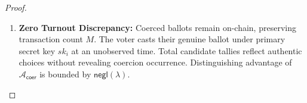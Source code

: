 \documentclass[10pt,letterpaper,journal]{IEEEtran}
\begin{document}
\begin{proof}
\begin{enumerate}[leftmargin=*,noitemsep]
\begin{equation}
  \end{equation}
  (iii)~Trustees accumulate masked ballots into master aggregate ciphertext:
  \begin{equation}
    \mathbf{C}_{\mathsf{agg}} = \sum_{j=1}^M [b_j] \cdot \mathbf{c}_j + E(\mathbf{0}; \mathbf{r}'_j);
  \end{equation}
  (iv)~Trustees jointly decrypt only $\mathbf{C}_{\mathsf{agg}}$. Duress ballots ($b_j = 0$) scale to $E(\mathbf{0})$ and are neutralized. Individual $[b_j]$ and $[\nu_i^{\mathsf{dur}}]$ are never revealed, guaranteeing zero leakage to trustees.
  \item \textbf{Zero Turnout Discrepancy:} Coerced ballots remain on-chain, preserving transaction count $M$. The voter casts their genuine ballot under primary secret key $sk_i$ at an unobserved time. Total candidate tallies reflect authentic choices without revealing coercion occurrence. Distinguishing advantage of $\mathcal{A}_{\mathsf{coer}}$ is bounded by $\mathsf{negl}(\lambda)$.
\end{enumerate}
\end{proof}



\end{document}
